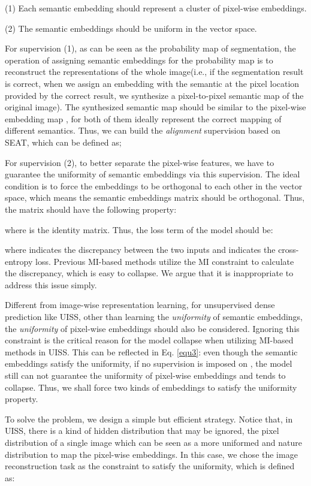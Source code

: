 \documentclass[letterpaper]{article} \usepackage{aaai23}  \usepackage{times}  \usepackage{helvet}  \usepackage{courier}  \usepackage[hyphens]{url}  \usepackage{graphicx} \urlstyle{rm} \def\UrlFont{\rm}  \usepackage{natbib}  \usepackage{caption} \frenchspacing  \setlength{\pdfpagewidth}{8.5in}  \setlength{\pdfpageheight}{11in}  \usepackage{algorithm}
\begin{document}
(1) Each semantic embedding should represent a cluster of pixel-wise embeddings.

(2) The semantic embeddings should be uniform in the vector space.

For supervision (1), as  can be seen as the probability map of segmentation, the operation of assigning semantic embeddings  for the probability map is to reconstruct the representations of the whole image(i.e., if the segmentation result is correct, when we assign an embedding with the semantic at the pixel location provided by the correct result, we synthesize a pixel-to-pixel semantic map of the original image). The synthesized semantic map should be similar to the pixel-wise embedding map , for both of them ideally represent the correct mapping of different semantics. Thus, we can build the \textit{alignment} supervision based on SEAT, which can be defined as;


For supervision (2), to better separate the pixel-wise features, we have to guarantee the uniformity of semantic embeddings via this supervision. The ideal condition is to force the embeddings to be orthogonal to each other in the vector space, which means the semantic embeddings matrix  should be orthogonal. Thus, the matrix  should have the following property:

where  is the identity matrix. 
Thus, the loss term of the model should be:

where  indicates the discrepancy between the two inputs and  indicates the cross-entropy loss.
Previous MI-based methods utilize the MI constraint to calculate the discrepancy, which is easy to collapse. We argue that it is inappropriate to address this issue simply.

Different from image-wise representation learning, for unsupervised dense prediction like UISS, other than learning the \textit{uniformity} of semantic embeddings, the \textit{uniformity} of pixel-wise embeddings should also be considered. Ignoring this constraint is the critical reason for the model collapse when utilizing MI-based methods in UISS. This can be reflected in Eq. \ref{equ3}: even though the semantic embeddings  satisfy the uniformity, if no supervision is imposed on , the model still can not guarantee the uniformity of pixel-wise embeddings and tends to collapse. Thus, we shall force two kinds of embeddings to satisfy the uniformity property.

To solve the problem, we design a simple but efficient strategy. Notice that, in UISS, there is a kind of hidden distribution that may be ignored, the pixel distribution of a single image which can be seen as a more uniformed and nature distribution to map the pixel-wise embeddings. In this case, we chose the image reconstruction task as the constraint to satisfy the uniformity, which is defined as:
\end{document}
